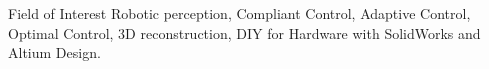 \begin{rSection}{Field of Interest}
Robotic perception, Compliant Control, Adaptive Control, Optimal Control, 3D reconstruction, DIY for Hardware with SolidWorks and Altium Design.
\end{rSection}

